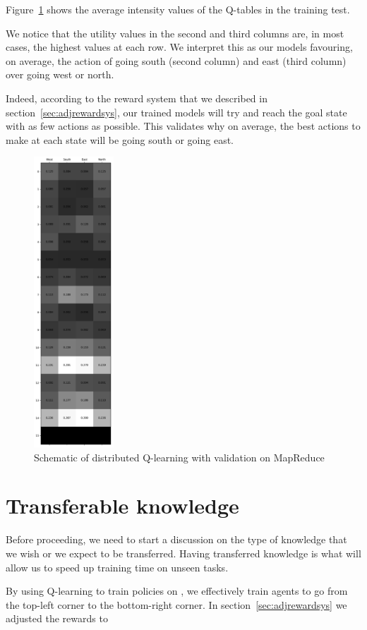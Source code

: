 Figure~\ref{fig:Qvalues} shows the average intensity values of the Q-tables in the training test.

We notice that the utility values in the second and third columns are, in most cases, the highest values at each row. We interpret this as our models favouring, on average, the action of going south (second column) and east (third column) over going west or north.

Indeed, according to the reward system that we described in section~\ref{sec:adjrewardsys}, our trained models will try and reach the goal state with as few actions as possible. This validates why on average, the best actions to make at each state will be going south or going east.

\begin{figure}
\centering
\includegraphics[width=3cm]{Figures/Qtable_mean}
\caption{Schematic of distributed Q-learning with validation on MapReduce}
\label{fig:Qvalues}
\end{figure}

\section{Transferable knowledge}
\label{sec:transferableknowledge}
Before proceeding, we need to start a discussion on the type of knowledge that we wish or we expect to be transferred. Having transferred knowledge is what will allow us to speed up training time on unseen tasks.

By using Q-learning to train policies on , we effectively train agents to go from the top-left corner to the bottom-right corner.
In section~\ref{sec:adjrewardsys} we adjusted the rewards to 
